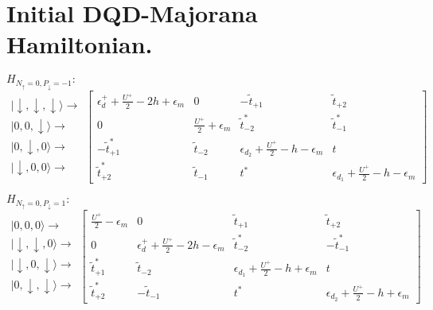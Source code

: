 




\section{Initial DQD-Majorana Hamiltonian.\label{sec:Double-Dot-Majorana-Hamiltonian.}}

$H_{N_{\uparrow}=0,P_{\downarrow}=-1}:$
\[
\begin{array}{c}
\vert\downarrow,\downarrow,\downarrow\rangle\rightarrow\\
\vert0,0,\downarrow\rangle\rightarrow\\
\vert0,\downarrow,0\rangle\rightarrow\\
\vert\downarrow,0,0\rangle\rightarrow
\end{array}\left[\begin{array}{cccc}
\epsilon_{d}^{+}+\frac{U^{+}}{2}-2h+\epsilon_{m} & 0 & -\tilde{t}_{+1} & \tilde{t}_{+2}\\
0 & \frac{U^{+}}{2}+\epsilon_{m} & \tilde{t}_{-2}^{*} & \tilde{t}_{-1}^{*}\\
-\tilde{t}_{+1}^{*} & \tilde{t}_{-2} & \epsilon_{d_{2}}+\frac{U^{+}}{2}-h-\epsilon_{m} & t\\
\tilde{t}_{+2}^{*} & \tilde{t}_{-1} & t^{*} & \epsilon_{d_{1}}+\frac{U^{+}}{2}-h-\epsilon_{m}
\end{array}\right]
\]


$H_{N_{\uparrow}=0,P_{\downarrow}=1}:$
\[
\begin{array}{c}
\vert0,0,0\rangle\rightarrow\\
\vert\downarrow,\downarrow,0\rangle\rightarrow\\
\vert\downarrow,0,\downarrow\rangle\rightarrow\\
\vert0,\downarrow,\downarrow\rangle\rightarrow
\end{array}\left[\begin{array}{cccc}
\frac{U^{+}}{2}-\epsilon_{m} & 0 & \tilde{t}_{+1} & \tilde{t}_{+2}\\
0 & \epsilon_{d}^{+}+\frac{U^{+}}{2}-2h-\epsilon_{m} & \tilde{t}_{-2}^{*} & -\tilde{t}_{-1}^{*}\\
\tilde{t}_{+1}^{*} & \tilde{t}_{-2} & \epsilon_{d_{1}}+\frac{U^{+}}{2}-h+\epsilon_{m} & t\\
\tilde{t}_{+2}^{*} & -\tilde{t}_{-1} & t^{*} & \epsilon_{d_{2}}+\frac{U^{+}}{2}-h+\epsilon_{m}
\end{array}\right]
\]


